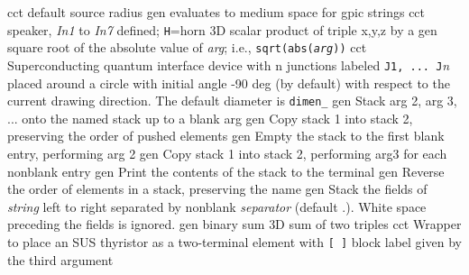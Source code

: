   {cct}
  {default source radius}
  {gen}
  {evaluates to medium space for gpic strings}
  {cct}
  {speaker, {\sl In1} to {\sl In7} defined; {\tt H}=horn
   }
  {3D}
  {scalar product of triple x,y,z by a}
  {gen}
  {square root of the absolute value of {\sl arg}; i.e.,
   {\tt sqrt(abs({\sl arg}))}}
  {cct}
  {Superconducting quantum interface device
   with {\sl }n junctions labeled {\tt J1, ... J}{\sl n}
   placed around a circle with initial
   angle -90 deg (by default) with respect
   to the current drawing direction. The
   default diameter is {\tt dimen\_} }
  {gen}
  {Stack arg 2, arg 3, ... onto the named stack up to a blank arg}
  {gen}
  {Copy stack 1 into stack 2, preserving the order of pushed elements}
  {gen}
  {Empty the stack to the first blank entry, performing arg 2}
  {gen}
  {Copy stack 1 into stack 2, performing arg3 for each nonblank entry}
  {gen}
  {Print the contents of the stack to the terminal}
  {gen}
  {Reverse the order of elements in a stack, preserving the name}
  {gen}
  {Stack the fields of {\sl string} left to right separated by nonblank
    {\sl separator} (default .).  White space preceding the fields is ignored.}
  {gen}
  {binary sum}
  {3D}
  {sum of two triples}
  {cct}
  {Wrapper to place an SUS thyristor as a two-terminal element with
   {\tt [ ]} block label given by the third argument
    }

